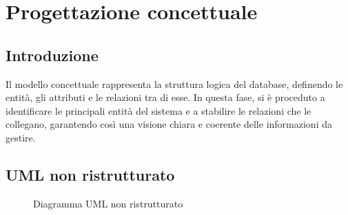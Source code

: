 \section{Progettazione concettuale}
\subsection{Introduzione}
Il modello concettuale rappresenta la struttura logica del database, definendo le entità, gli attributi e le relazioni tra di esse. In questa fase, si è proceduto a identificare le principali entità del sistema e a stabilire le relazioni che le collegano, garantendo così una visione chiara e coerente delle informazioni da gestire.
\subsection{UML non ristrutturato}
\begin{figure}[H]
    \noindent{}
    \caption{Diagramma UML non ristrutturato}
\end{figure}
